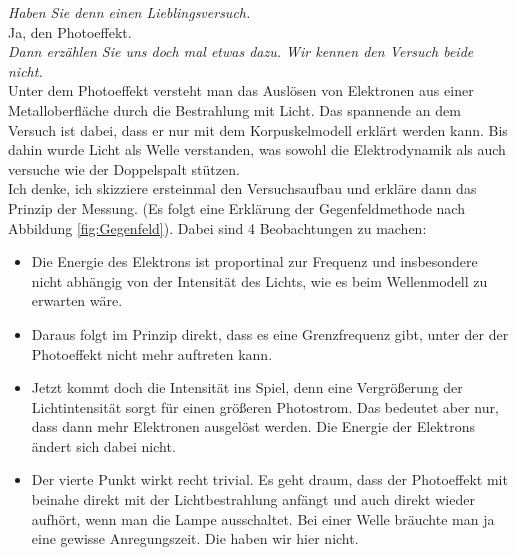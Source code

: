 
\textit{Haben Sie denn einen Lieblingsversuch.}
\\
Ja, den Photoeffekt.
\\
\textit{Dann erzählen Sie uns doch mal etwas dazu. Wir kennen den Versuch beide nicht.}
\\
Unter dem Photoeffekt versteht man das Auslösen von Elektronen aus einer Metalloberfläche durch die Bestrahlung mit Licht. Das spannende
an dem Versuch ist dabei, dass er nur mit dem Korpuskelmodell erklärt werden kann. Bis dahin wurde Licht als Welle verstanden, was sowohl
die Elektrodynamik als auch versuche wie der Doppelspalt stützen.
\\
Ich denke, ich skizziere ersteinmal den Versuchsaufbau und erkläre dann das Prinzip der Messung. 
(Es folgt eine Erklärung der Gegenfeldmethode nach Abbildung \ref{fig:Gegenfeld}). 
Dabei sind 4 Beobachtungen zu machen:
\begin{itemize}
    \item Die Energie des Elektrons ist proportinal zur Frequenz und insbesondere nicht abhängig von der Intensität des Lichts, wie es beim 
        Wellenmodell zu erwarten wäre. 
    \item Daraus folgt im Prinzip direkt, dass es eine Grenzfrequenz gibt, unter der der Photoeffekt nicht mehr auftreten kann.
    \item Jetzt kommt doch die Intensität ins Spiel, denn eine Vergrößerung der Lichtintensität sorgt für einen größeren Photostrom. 
        Das bedeutet aber nur, dass dann mehr Elektronen ausgelöst werden. Die Energie der Elektrons ändert sich dabei nicht.
    \item Der vierte Punkt wirkt recht trivial. Es geht draum, dass der Photoeffekt mit beinahe direkt mit der Lichtbestrahlung anfängt
        und auch direkt wieder aufhört, wenn man die Lampe ausschaltet. Bei einer Welle bräuchte man ja eine gewisse Anregungszeit. Die 
        haben wir hier nicht.
\end{itemize}

